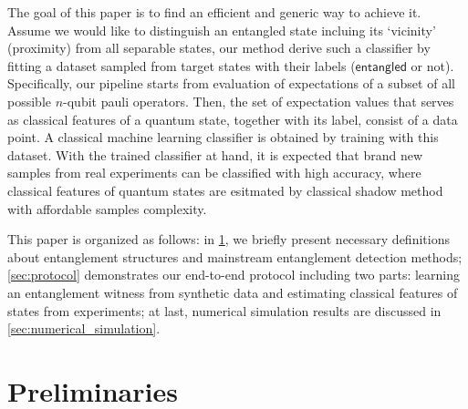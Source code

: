 \documentclass[
reprint,
aps,
pra,
floatfix,
]{revtex4-2}
\theoremstyle{plain}
\theoremstyle{definition}
\newtheorem{notation}{Notation}
\newcommand{\ew}{W}
\newcommand{\ob}{O}
\newcommand{\dm}{\rho}
\newcommand{\entangled}{\textsf{entangled}}
\newcommand{\hamiltonian}{\hat{H}}
\begin{document}
The goal of this paper is to find an efficient and generic way to achieve it. 
Assume we would like to distinguish an entangled state incluing its `vicinity' (proximity) from all separable states, our method derive such a classifier by fitting a dataset sampled from target states with their labels ($\entangled$ or not).
Specifically, our pipeline starts from evaluation of expectations of a subset of all possible $n$-qubit pauli operators. 
Then, the set of expectation values that serves as classical features of a quantum state, together with its label, consist of a data point.
A classical machine learning classifier is obtained by training with this dataset.
With the trained classifier at hand, it is expected that brand new samples from real experiments can be classified with high accuracy, 
where classical features of quantum states are esitmated by classical shadow method \cite{huangPredictingManyProperties2020} with affordable samples complexity.

This paper is organized as follows: in \cref{sec:preliminaries}, we briefly present necessary definitions about entanglement structures and mainstream entanglement detection methods;
\cref{sec:protocol} demonstrates our end-to-end protocol including two parts: learning an entanglement witness from synthetic data and estimating classical features of states from experiments;
at last, numerical simulation results are discussed in \cref{sec:numerical_simulation}.

\section{Preliminaries}\label{sec:preliminaries}
\end{document}
